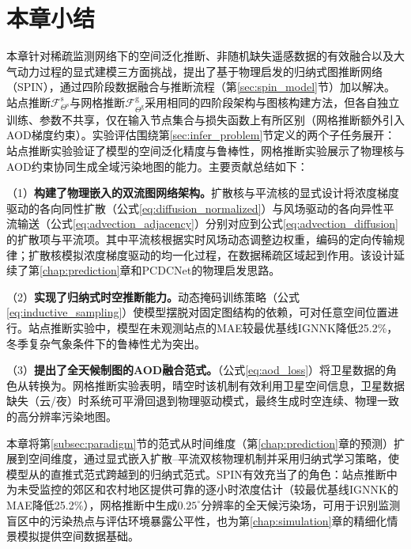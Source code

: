 \section{本章小结}
\label{sec:infer_summary}

本章针对稀疏监测网络下的空间泛化推断、非随机缺失遥感数据的有效融合以及大气动力过程的显式建模三方面挑战，提出了基于物理启发的归纳式图推断网络（SPIN），通过四阶段数据融合与推断流程（第\ref{sec:spin_model}节）加以解决。站点推断$\mathcal{F}^{\text{s}}_{\Theta^{\text{s}}}$与网格推断$\mathcal{F}^{\text{g}}_{\Theta^{\text{g}}}$采用相同的四阶段架构与图核构建方法，但各自独立训练、参数不共享，仅在输入节点集合与损失函数上有所区别（网格推断额外引入AOD梯度约束）。实验评估围绕第\ref{sec:infer_problem}节定义的两个子任务展开：站点推断实验验证了模型的空间泛化精度与鲁棒性，网格推断实验展示了物理核与AOD约束协同生成全域污染地图的能力。主要贡献总结如下：

（1）\textbf{构建了物理嵌入的双流图网络架构。}扩散核与平流核的显式设计将浓度梯度驱动的各向同性扩散（公式\eqref{eq:diffusion_normalized}）与风场驱动的各向异性平流输送（公式\eqref{eq:advection_adjacency}）分别对应到公式\eqref{eq:advection_diffusion}的扩散项与平流项。其中平流核根据实时风场动态调整边权重，编码的定向传输规律；扩散核模拟浓度梯度驱动的均一化过程，在数据稀疏区域起到作用。该设计延续了第\ref{chap:prediction}章\ModelPred{}和PCDCNet的物理启发思路。

（2）\textbf{实现了归纳式时空推断能力。}动态掩码训练策略（公式\eqref{eq:inductive_sampling}）使模型摆脱对固定图结构的依赖，可对任意空间位置进行。站点推断实验中，模型在未观测站点的MAE较最优基线IGNNK降低25.2\%，冬季复杂气象条件下的鲁棒性尤为突出。

（3）\textbf{提出了全天候制图的AOD融合范式。}（公式\eqref{eq:aod_loss}）将卫星数据的角色从转换为。网格推断实验表明，晴空时该机制有效利用卫星空间信息，卫星数据缺失（云/夜）时系统可平滑回退到物理驱动模式，最终生成时空连续、物理一致的高分辨率污染地图。

本章将第\ref{subsec:paradigm}节的范式从时间维度（第\ref{chap:prediction}章的预测）扩展到空间维度，通过显式嵌入扩散--平流双核物理机制并采用归纳式学习策略，使模型从的直推式范式跨越到的归纳式范式。SPIN有效充当了的角色：站点推断中为未受监控的郊区和农村地区提供可靠的逐小时浓度估计（较最优基线IGNNK的MAE降低25.2\%），网格推断中生成$0.25^{\circ}$分辨率的全天候污染场，可用于识别监测盲区中的污染热点与评估环境暴露公平性，也为第\ref{chap:simulation}章的精细化情景模拟提供空间数据基础。